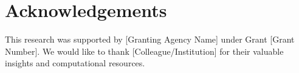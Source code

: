 \section*{Acknowledgements}
This research was supported by [Granting Agency Name] under Grant [Grant Number]. We would like to thank [Colleague/Institution] for their valuable insights and computational resources.
